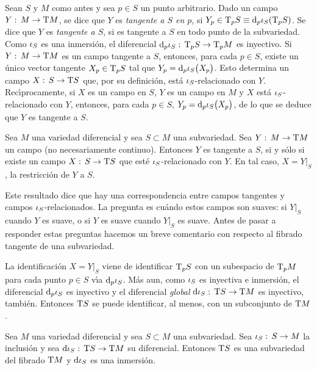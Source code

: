 Sean $S$ y $M$ como antes y sea $p\in S$ un punto arbitrario. Dado un campo
$Y:\,M\rightarrow\tangente{M}$, se dice que $Y$ es \emph{tangente a $S$ en %
$p$}, si $Y_{p}\in\tangente[p]{S}\equiv%
\diferencial[p]{\inc[S]}(\tangente[p]{S})$. Se dice que $Y$ es
\emph{tangente a $S$}, si es tangente a $S$ en todo punto de la subvariedad.
Como $\inc[S]$ es una inmersi\'{o}n, el diferencial
$\diferencial[p]{\inc[S]}:\,\tangente[p]{S}\rightarrow\tangente[p]{M}$ es
inyectivo. Si $Y:\,M\rightarrow\tangente{M}$ es un campo tangente a $S$,
entonces, para cada $p\in S$, existe un \'{u}nico vector tangente
$X_{p}\in\tangente[p]{S}$ tal que
$Y_{p}=\diferencial[p]{\inc[S]}\big(X_{p}\big)$. Esto determina un campo
$X:\,S\rightarrow\tangente{S}$ que, por su definici\'{o}n, est\'{a}
$\inc[S]$-relacionado con $Y$. Rec\'{\i}procamente, si $X$ es un campo
en $S$, $Y$ es un campo en $M$ y $X$ est\'{a} $\inc[S]$-relacionado con
$Y$, entonces, para cada $p\in S$,
$Y_{p}=\diferencial[p]{\inc[S]}\big(X_{p}\big)$, de lo que se deduce que
$Y$ es tangente a $S$.

\begin{propoCamposTangentes}\label{thm:campostangentes}
	Sea $M$ una variedad diferencial y sea $S\subset M$ una subvariedad.
	Sea $Y:\,M\rightarrow\tangente{M}$ un campo (no necesariamente
	continuo). Entonces $Y$ es tangente a $S$, si y s\'{o}lo si
	existe un campo $X:\,S\rightarrow\tangente{S}$ que est\'{e}
	$\inc[S]$-relacionado con $Y$. En tal caso, $X=Y|_{S}$,
	la restricci\'{o}n de $Y$ a $S$.
\end{propoCamposTangentes}

Este resultado dice que hay una correspondencia entre campos tangentes
y campos $\inc[S]$-relacionados. La pregunta es cu\'{a}ndo estos
campos son suaves: si $Y|_{S}$ cuando $Y$ es suave, o si $Y$ es suave
cuando $Y|_{S}$ es suave. Antes de pasar a responder estas preguntas hacemos
un breve comentario con respecto al fibrado tangente de una subvariedad.

La identificaci\'{o}n $X=Y|_{S}$ viene de identificar $\tangente[p]{S}$
con un subespacio de $\tangente[p]{M}$ para cada punto $p\in S$ v\'{\i}a
$\diferencial[p]{\inc[S]}$. M\'{a}s aun, como $\inc[S]$ es inyectiva e
inmersi\'{o}n, el diferencial $\diferencial[p]{\inc[S]}$ es inyectivo y
el diferencial \emph{global}
$\diferencial{\inc[S]}:\,\tangente{S}\rightarrow\tangente{M}$ es inyectivo,
tambi\'{e}n. Entonces $\tangente{S}$ se puede identificar, al menos, con un
subconjunto de $\tangente{M}$.

\begin{propoTangenteSubvarSubvar}\label{thm:tangentesubvarsubvar}
	Sea $M$ una variedad diferencial y sea $S\subset M$ una subvariedad.
	Sea $\inc[S]:\,S\rightarrow M$ la inclusi\'{o}n y sea
	$\diferencial{\inc[S]}:\,\tangente{S}\rightarrow\tangente{M}$ su
	diferencial. Entonces $\tangente{S}$ es una subvariedad del fibrado
	$\tangente{M}$ y $\diferencial{\inc[S]}$ es una inmersi\'{o}n.
\end{propoTangenteSubvarSubvar}

